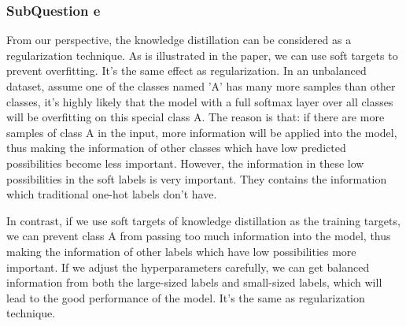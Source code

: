\documentclass[conference]{IEEEtran}
\begin{document}
\subsubsection{SubQuestion e}
From our perspective, the knowledge distillation can be considered as a regularization technique. As is illustrated in the paper\cite{b6}, we can use soft targets to prevent overfitting. It's the same effect as regularization.
In an unbalanced dataset, assume one of the classes named 'A' has many more samples than other classes, it's highly likely that the model with a full softmax layer over all classes will be overfitting on this special class A.
The reason is that: if there are more samples of class A in the input, more information will be applied into the model, thus making the information of other classes which have low predicted possibilities become less important. 
However, the information in these low possibilities in the soft labels is very important. They contains the information which traditional one-hot labels don't have. 
\par
In contrast, if we use soft targets of knowledge distillation as the training targets, we can prevent class A from passing too much information into the model, thus making the information of other labels which have low possibilities more important.
If we adjust the hyperparameters carefully, we can get balanced information from both the large-sized labels and small-sized labels, which will lead to the good performance of the model. It's the same as regularization technique.
\end{document}
